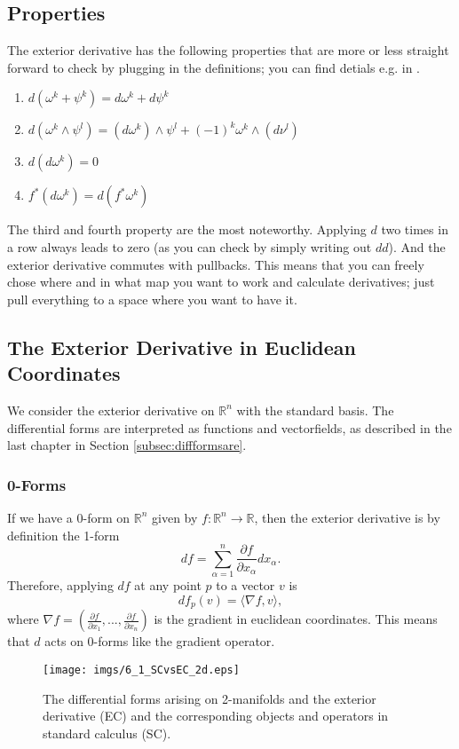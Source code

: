 \subsection{Properties}
The exterior derivative has the following properties that are more or less straight forward to check by plugging in the definitions; you can find detials e.g. in \cite{globalAnalysis}.

\begin{enumerate}
\item $d(\omega^k + \psi^k) = d\omega^k + d\psi^k$
\item $d(\omega^k \wedge \psi^l) =( d\omega^k) \wedge \psi^l + (-1)^k \omega^k \wedge(d \nu^l)$
\item $d(d\omega^k) = 0$
\item $f^*(d\omega^k) = d(f^* \omega^k)$
\end{enumerate}
 The third and fourth property are the most noteworthy.  Applying $d$ two times in a row always leads to zero (as you can check by simply writing out $dd$). And the exterior derivative commutes with pullbacks. This means that you can freely chose where and in what map you want to work and calculate derivatives; just pull everything to a space where you want to have it.


\subsection{The Exterior Derivative in Euclidean Coordinates}
\label{subsec:EDeuclidean}
We consider the exterior derivative on $\mathbb R^n$ with the standard basis. The differential forms are interpreted as functions and vectorfields, as described in the last chapter in Section \ref{subsec:diffformsare}.

\subsubsection{0-Forms}
If we have a $0$-form on $\mathbb R^n$  given by $f:\mathbb R^n \to \mathbb R$, then the exterior derivative is by definition the 1-form
\[df = \sum_{\alpha = 1}^n \frac{\partial f}{\partial x_\alpha} dx_\alpha .\]
Therefore, applying $df$ at any point $p$ to a vector $v$ is
\[df_p(v) = \langle \nabla f, v \rangle,\]
where $\nabla f = (\frac{\partial f}{\partial x_1},...,\frac{\partial f}{\partial x_n})$ is the gradient in euclidean coordinates. This means that $d$ acts on $0$-forms like the gradient operator.


\begin{figure}
\begin{center}
\texttt{[image: imgs/6\_1\_SCvsEC\_2d.eps]}
\caption{The differential forms arising on 2-manifolds and the exterior derivative (EC) and the corresponding objects and operators in standard calculus (SC).}
\label{fig::6_1_SC2d}
\end{center}

\end{figure}

